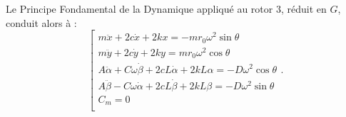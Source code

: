 \begin{multicols}{2}
Le Principe Fondamental de la Dynamique appliqué au rotor 3, réduit en $G$,
conduit alors à :
$$
\left[
\begin{array}{l}
m\ddot{x}+2c\dot{x}+2kx =-mr_0\omega^2 \sin \theta \\
m\ddot{y}+2c\dot{y}+2ky = mr_0\omega^2 \cos \theta \\
A\ddot{\alpha}+C\omega \dot{\beta }+2cL\dot{\alpha}+2kL\alpha =-D\omega^2 \cos \theta \\
A\ddot{\beta} - C\omega \dot{\alpha}+2cL\dot{\beta}+2kL\beta =-D\omega^2 \sin \theta \\
C_m=0 \\
\end{array}
\right. .
$$

\subparagraph{}
\textit{}
\ifprof
\begin{corrige}
\end{corrige}
\else
\fi


\subparagraph{}
\textit{}
\ifprof
\begin{corrige}
\end{corrige}
\else
\fi



\ifprof
\else
\end{multicols}
\fi

